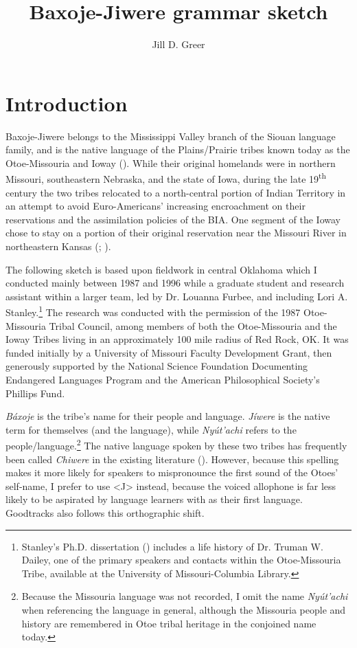 \documentclass[output=paper]{LSP/langsci}
\author{Jill D. Greer}
\title{{Baxoje-Jiwere} grammar sketch }
\begin{document}
\section{Introduction}

Baxoje-Jiwere belongs to the Mississippi Valley branch of the Siouan language family, and is the native language of the Plains/Prairie tribes known today as the Otoe-Missouria and Ioway (\citealt[3,8]{Goddard1996}).  While their original homelands were in northern Missouri, southeastern Nebraska, and the state of Iowa, during the late 19\textsuperscript{th} century the two tribes relocated to a north-central portion of Indian Territory in an attempt to avoid Euro-Americans' increasing encroachment on their reservations and the assimilation policies of the BIA.  One segment of the Ioway chose to stay on a portion of their original reservation near the Missouri River in northeastern Kansas (\citealt{Wedel2001}; \citealt{Schweitzer2001}).  

The following sketch is based upon fieldwork in central Oklahoma which I conducted mainly between 1987 and 1996 while a graduate student and research assistant within a larger team, led by Dr. Louanna Furbee, and including Lori A. Stanley.\footnote {Stanley's Ph.D. dissertation (\citet{Stanley1993}) includes a life history of Dr. Truman W. Dailey, one of the primary speakers and contacts within the Otoe-Missouria Tribe, available at the University of Missouri-Columbia Library.} The research was conducted with the permission of the 1987 Otoe-Missouria Tribal Council, among members of both the Otoe-Missouria and the Ioway Tribes living in an approximately 100 mile radius of Red Rock, OK.  It was funded initially by a University of Missouri Faculty Development Grant, then generously supported by the National Science Foundation Documenting Endangered Languages Program and the American Philosophical Society's Phillips Fund.

\emph{Báxoje} is the  tribe's name for their people and language.  \emph{Jíwere} is the native  term for themselves (and the language), while \emph{Nyút'achi} refers to the  people/language.\footnote{Because the Missouria language was not recorded, I omit the name \emph{Nyút'achi} when referencing the language in general, although the Missouria people and history are remembered in Otoe tribal heritage in the conjoined name today.} The native language spoken by these two tribes has frequently been called \textit{Chiwere} in the existing literature (\citealt{Whitman1947, Marsh1936, Wedel2001, Schweitzer2001}).  However, because this spelling makes it more likely for  speakers to mispronounce the first sound of the Otoes' self-name, I prefer to use <J> instead, because the voiced allophone is far less likely to be aspirated by language learners with  as their first language. Goodtracks also follows this orthographic shift.  
\end{document}

